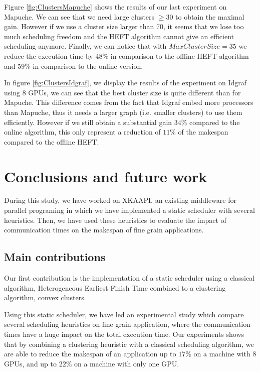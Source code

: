 \documentclass[10pt, conference, compsocconf,pdftex,dvipsnames]{IEEEtran}
\begin{document}
Figure \ref{fig:ClustersMapuche} shows the results of our last experiment on
Mapuche. We can see that we need large clusters $\geq 30$ to obtain the maximal
gain. However if we use a cluster size larger than $70$, it seems that we
lose too much scheduling freedom and the HEFT algorithm cannot give an efficient
scheduling anymore. Finally, we can notice that with $MaxClusterSize=35$ we
reduce the execution time by $48\%$ in comparison to the offline HEFT
algorithm and $59\%$ in comparison to the online version.

In figure \ref{fig:ClustersIdgraf}, we display the results of the experiment
on Idgraf using $8$ GPUs, we can see that the best cluster size is quite
different than for Mapuche. This difference comes from the fact that Idgraf
embed more processors than Mapuche, thus it needs a larger graph (i.e.
smaller clusters) to use them efficiently. However if we still obtain a
substantial gain $34\%$ compared to the online algorithm, this only represent
a reduction of $11\%$ of the makespan compared to the offline HEFT.  

\section{Conclusions and future work}
\label{sec:cncl}
During this study, we have worked on
XKAAPI\cite{gautier2007kaapi,gautierxkaapi}, an existing middleware for
parallel programing in which we have implemented a static scheduler with
several heuristics. Then, we have used these heuristics to evaluate the impact
of communication times on the makespan of fine grain applications.

\subsection{Main contributions}
\label{chap:cncl-contrib}
Our first contribution is the implementation of a static scheduler using
a classical algorithm, Heterogeneous Earliest Finish Time combined to a
clustering algorithm, convex clusters. 

Using this static scheduler, we have led an experimental study which compare
several scheduling heuristics on fine grain application, where the
communication times have a huge impact on the total execution time.  Our
experiments shows that by combining a clustering heuristic with a classical
scheduling algorithm, we are able to reduce the makespan of an application  up
to $17\%$ on a machine with $8$ GPUs, and up to $22\%$ on a machine with only
one GPU.
\end{document}
